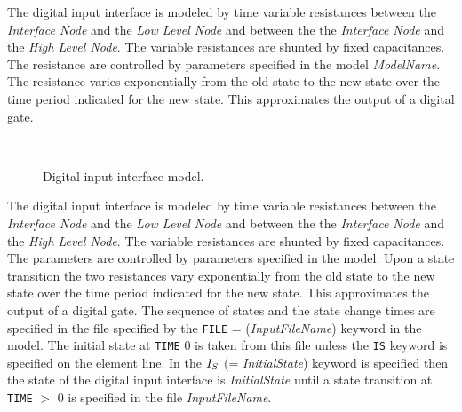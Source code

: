 The digital input interface is modeled by time variable resistances between
the {\it Interface Node} and the {\it Low Level Node} and between the
the {\it Interface Node} and the {\it High Level Node}.
The variable resistances are shunted by fixed capacitances.
The resistance are controlled by parameters specified in the model
{\it ModelName}.
The resistance varies exponentially from the old state to the new state over
the time period indicated for the new state.
This approximates the output of a digital gate. \\[0.2in]


\begin{figure}[h]
\centering
\ 
\caption{Digital input interface model.}
\end{figure}


The digital input interface is modeled by time variable resistances between
the {\it Interface Node} and the {\it Low Level Node} and between the
the {\it Interface Node} and the {\it High Level Node}.
The variable resistances are shunted by fixed capacitances.
The parameters are controlled by parameters specified in the model.
Upon a state transition the two resistances vary exponentially from the old
state to the new state over the time period indicated for the new state.
This approximates the output of a digital gate.  The sequence of states and
the state change times are specified in the file specified by the {\tt FILE}
= ({\it InputFileName})
keyword in the model.  The initial state at {\tt TIME} 0 is taken from this
file unless the {\tt IS} keyword is specified on the
element line. In the $I_S$ (= {\it InitialState}) keyword is specified
then the state of the digital input interface is {\it InitialState}
until a state transition at {\tt TIME} $>$ 0 is specified in the file
{\it InputFileName}.

